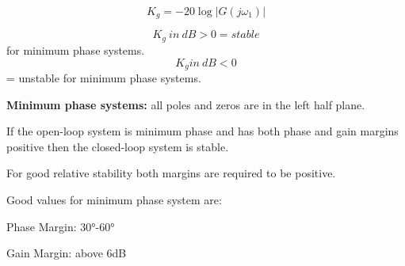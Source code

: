 \begin{multicols}{3}
\[K_{g} = - 20\log\left| G\left( j\omega_{1} \right) \right|\]

\[K_{g}\ in\ dB > 0 = stable\] for minimum phase systems. 
	\[K_{g}in\ dB < 0\] = unstable for minimum phase systems. 

\textbf{Minimum phase systems:} all poles and zeros are in the left half
plane.

If the open-loop system is minimum phase and has both phase and gain
margins positive then the closed-loop system is stable.

For good relative stability both margins are required to be positive.

Good values for minimum phase system are:

Phase Margin: 30°-60°

Gain Margin: above 6dB


\end{multicols}